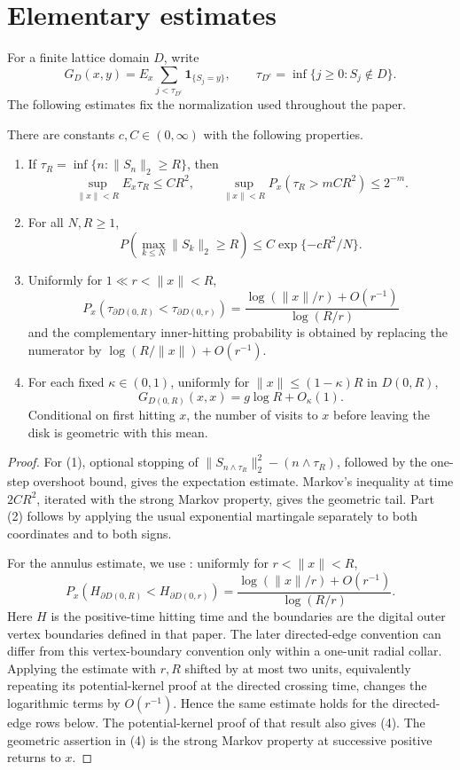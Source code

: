\section{Elementary estimates}\label{sec:elementary}
For a finite lattice domain $D$, write
\[
 G_D(x,y)=E_x\sum_{j<\tau_{D^c}}\mathbf1_{\{S_j=y\}},
 \qquad \tau_{D^c}=\inf\{j\ge0:S_j\notin D\}.
\]
The following estimates fix the normalization used throughout the paper.
\begin{lemma}\label{lem:elementary-walk-estimates}
There are constants \(c,C\in(0,\infty)\) with the following properties.

\begin{enumerate}\item If \(\tau_R=\inf\{n:\lVert S_n\rVert_2\ge R\}\), then
   \[
       \sup_{\lVert x\rVert<R}E_x\tau_R\le C R^2,\qquad
       \sup_{\lVert x\rVert<R}P_x(\tau_R>mCR^2)\le 2^{-m}.
   \]
\item For all \(N,R\ge1\),
   \[
       P\left(\max_{k\le N}\lVert S_k\rVert_2\ge R\right)
       \le C\exp\{-cR^2/N\}.
   \]
\item Uniformly for \(1\ll r<\lVert x\rVert<R\),
   \[
   P_x(\tau_{\partial D(0,R)}<\tau_{\partial D(0,r)})
     =\frac{\log(\lVert x\rVert/r)+O(r^{-1})}{\log(R/r)}
   \]
   and the complementary inner-hitting probability is obtained by replacing
   the numerator by \(\log(R/\lVert x\rVert)+O(r^{-1})\).
\item For each fixed $\kappa\in(0,1)$, uniformly for $\|x\|\le(1-\kappa)R$ in
   \(D(0,R)\),
   \[
       G_{D(0,R)}(x,x)=g\log R+O_\kappa(1).
   \]
   Conditional on first hitting \(x\), the number of visits to \(x\) before
   leaving the disk is geometric with this mean.
\end{enumerate}
\end{lemma}

\begin{proof}
For (1), optional stopping of
\(\lVert S_{n\wedge\tau_R}\rVert_2^2-(n\wedge\tau_R)\), followed by the
one-step overshoot bound, gives the expectation estimate.  Markov's
inequality at time \(2CR^2\), iterated with the strong Markov property,
gives the geometric tail.  Part (2) follows by applying the usual
exponential martingale separately to both coordinates and to both signs.

For the annulus estimate, we use \cite[Lemma~2.1, (2.5)]{HLOZ2025}:
uniformly for $r<\|x\|<R$,
\[
 P_x(H_{\partial D(0,R)}<H_{\partial D(0,r)})
 =\frac{\log(\|x\|/r)+O(r^{-1})}{\log(R/r)}.
\]
Here \(H\) is the positive-time hitting time and the boundaries are the
digital outer vertex boundaries defined in that paper.  The later
directed-edge convention can differ from this vertex-boundary convention
only within a one-unit radial collar.  Applying the estimate with \(r,R\)
shifted by at most two units, equivalently repeating its potential-kernel
proof at the directed crossing time, changes the logarithmic terms by
\(O(r^{-1})\).  Hence the same estimate holds for the directed-edge rows
below.  The potential-kernel proof of that result also gives (4).  The
geometric assertion in (4) is the strong Markov
property at successive positive returns to \(x\).
\end{proof}
